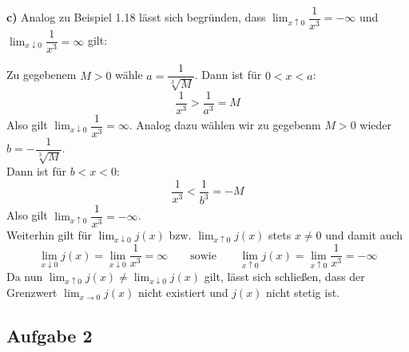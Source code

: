 \documentclass[a4paper,graphics,11pt]{article}
\newcommand{\aufgabe}[1]{\subsection*{Aufgabe #1}}
\begin{document}
\textbf{c)}
Analog zu Beispiel 1.18 lässt sich begründen, dass
$\lim_{x \uparrow 0}\limits\dfrac{1}{x^3} = -\infty$ und
$\lim_{x \downarrow 0}\limits\dfrac{1}{x^3} = \infty$ gilt:

Zu gegebenem $M > 0$ wähle $a= \dfrac{1}{\sqrt[3]{M}}$. Dann ist für $0 < x < a$:
$$
    \frac{1}{x^3} > \frac{1}{a^3} = M
$$
Also gilt $\lim_{x \downarrow 0}\limits \dfrac{1}{x^3} = \infty$. Analog dazu
wählen wir zu gegebenm $M>0$ wieder $b= -\dfrac{1}{\sqrt[3]{M}}$.\\
Dann ist für $b < x < 0$:
$$
    \frac{1}{x^3} < \frac{1}{b^3} = -M
$$
Also gilt $\lim_{x \uparrow 0}\limits \dfrac{1}{x^3} = -\infty$.\\
Weiterhin gilt für $\lim_{x \downarrow 0} j(x)$ bzw. $\lim_{x \uparrow 0} j(x)$ stets $x\neq0$ und damit auch
$$
    \lim_{x \downarrow 0} j(x) = \lim_{x \downarrow 0} \frac{1}{x^3} = \infty
    \qquad\text{sowie}\qquad
    \lim_{x \uparrow 0} j(x) = \lim_{x \uparrow 0} \frac{1}{x^3} = -\infty
$$
Da nun $\lim_{x \uparrow 0}\limits j(x) \neq \lim_{x \downarrow 0}\limits j(x)$ gilt,
lässt sich schließen, dass der Grenzwert $\lim_{x \to 0}\limits j(x)$ nicht existiert und
$j(x)$ nicht stetig ist.

\aufgabe{2}
\end{document}
